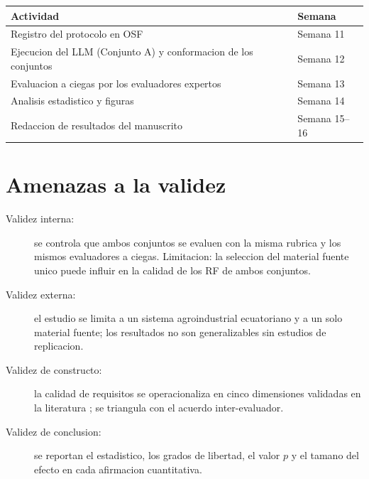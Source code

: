 \documentclass[12pt,a4paper]{article}
\begin{document}
\begin{center}
\begin{tabular}{l l}
\toprule
\textbf{Actividad} & \textbf{Semana} \\
\midrule
Registro del protocolo en OSF & Semana 11 \\
Ejecucion del LLM (Conjunto A) y conformacion de los conjuntos & Semana 12 \\
Evaluacion a ciegas por los evaluadores expertos & Semana 13 \\
Analisis estadistico y figuras & Semana 14 \\
Redaccion de resultados del manuscrito & Semana 15--16 \\
\bottomrule
\end{tabular}
\end{center}

\section{Amenazas a la validez}

\begin{description}
    \item[Validez interna:] se controla que ambos conjuntos se evaluen con la
    misma rubrica y los mismos evaluadores a ciegas. Limitacion: la seleccion
    del material fuente unico puede influir en la calidad de los RF de ambos
    conjuntos.
    \item[Validez externa:] el estudio se limita a un sistema agroindustrial
    ecuatoriano y a un solo material fuente; los resultados no son
    generalizables sin estudios de replicacion.
    \item[Validez de constructo:] la calidad de requisitos se operacionaliza en
    cinco dimensiones validadas en la literatura
    \cite{montgomery2022}; se triangula con el acuerdo inter-evaluador.
    \item[Validez de conclusion:] se reportan el estadistico, los grados de
    libertad, el valor \(p\) y el tamano del efecto en cada afirmacion
    cuantitativa.
\end{description}



\end{document}
